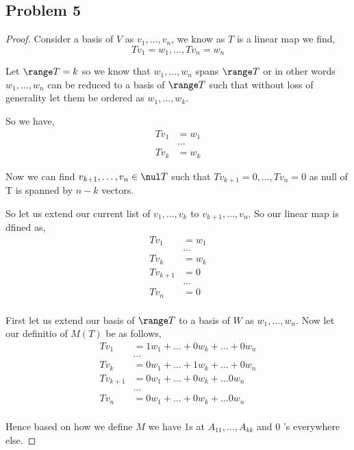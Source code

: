 \documentclass[a4paper]{report}
\begin{document}
\subsection*{Problem 5}
\begin{proof}
    Consider a basis of $V$ as $v_1,\dots,v_n$, we know as $T$ is a linear map we find, 
    $$ Tv_1 = w_1,\dots, Tv_n = w_n $$ 

    Let $\range T = k$ so we know that $w_1,\dots,w_n$ spans $\range T$ or in other words $w_1,\dots,w_n$ can be reduced to a basis of $\range T$ such that without loss of generality let them be ordered as $w_1,\dots,w_k$. 

    So we have, 
    \begin{align*}
        Tv_1 &= w_1\\
        &\dots\\
        Tv_k &= w_k
    \end{align*}

    Now we can find $v_{k+1},\dots,v_n \in \nul T$ such that $Tv_{k+1} = 0,\dots,Tv_n = 0$ as null of T is spanned by $n - k$ vectors.

    So let us extend our current list of  $v_1,\dots,v_k$ to $v_{k+1},\dots,v_n$. So our linear map is dfined as, 
    \begin{align*}
        Tv_1 &= w_1\\
        &\dots\\
        Tv_k &= w_k\\
        Tv_{k+1} &= 0\\
        &\dots\\
        Tv_{n} &= 0\\
    \end{align*}

    First let us extend our basis of $\range T$  to a basis of $W$ as $w_1,\dots,w_n$. Now let our definitio of $M(T)$ be as follows, 
    \begin{align*}
        Tv_1 &= 1w_1 + \dots + 0w_k + \dots + 0w_n\\
        &\dots\\
        Tv_k &= 0w_1 + \dots + 1w_k+ \dots + 0w_n\\
        Tv_{k+1} &= 0w_1 + \dots + 0w_k + \dots 0 w_n\\
        &\dots\\
        Tv_{n} &= 0w_1 + \dots + 0w_k + \dots 0w_n\\
    \end{align*}

    Hence based on how we define $M$ we have 1s at $A_{11},\dots,A_{kk}$ and $0$ 's everywhere else.


\end{proof}
\end{document}
